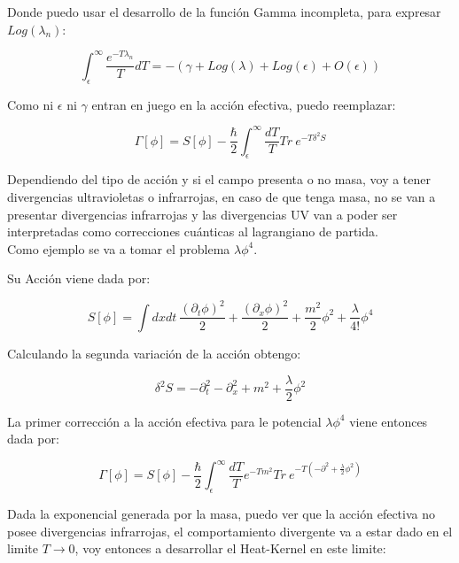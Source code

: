 Donde puedo usar el desarrollo de la función Gamma incompleta, para expresar $Log ( \lambda _n )$:

\begin{equation}
\int _ { \epsilon } ^{\infty} \frac{e ^{- T \lambda _n}}{T} dT =
- \left(
		\gamma + Log ( \lambda  ) + Log ( \epsilon  ) + O ( \epsilon  ) 
		\right)
\end{equation}

Como ni $ \epsilon $ ni $ \gamma $ entran en juego en la acción efectiva, puedo reemplazar:

\begin{equation}
\Gamma [ \phi ] = 
S[ \phi ] - 
\frac{\hbar }{2}
\int _ { \epsilon } ^{\infty} \frac{ dT}{T} Tr \  e ^{- T \delta ^2 S}
\end{equation}

Dependiendo del tipo de acción y si el campo presenta o no masa, voy a tener divergencias ultravioletas o infrarrojas, en caso de que tenga masa, no se van a presentar divergencias infrarrojas y las divergencias UV van a poder ser interpretadas como correcciones cuánticas al lagrangiano de partida. \\


Como ejemplo se va a tomar el problema $\lambda \phi ^4 $.

Su Acción viene dada por:

\begin{equation}
S[ \phi ] = \int dx dt \ 
\frac{( \partial _t \phi ) ^2}{2} +  
\frac{( \partial _x \phi ) ^2}{2} +
\frac{m ^2 }{2} \phi ^2 +
\frac{\lambda}{4!} \phi ^4 
\end{equation}

Calculando la segunda variación de la acción obtengo:

\begin{equation}
\delta ^2 S = 
- \partial _t ^2 
- \partial _x ^2 
+ m ^2 
+ \frac{\lambda}{2}\phi ^2 
\end{equation}

La primer corrección a la acción efectiva para le potencial $\lambda \phi ^4 $ viene entonces dada por:

\begin{equation}
\Gamma [ \phi ] = 
S[ \phi ] - 
\frac{\hbar }{2}
\int _ { \epsilon } ^{\infty} \frac{ dT}{T} 
e ^{- T m ^2 }
Tr \  e ^{- T ( - \partial ^2 + \frac{\lambda}{2} \phi ^2 ) }
\end{equation}

Dada la exponencial generada por la masa, puedo ver que la acción efectiva no posee divergencias infrarrojas, el comportamiento divergente va a estar dado en el limite $T \rightarrow 0$, voy entonces a desarrollar el Heat-Kernel en este limite:



